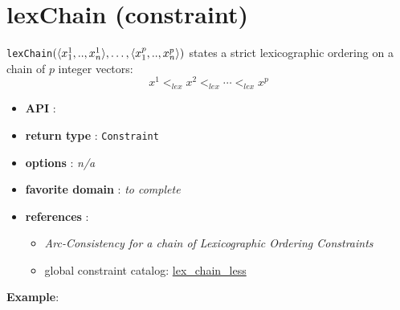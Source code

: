 \label{lexchain}
\hypertarget{lexchain}{}

\section{lexChain (constraint)}\label{lexchain:lexchainconstraint}\hypertarget{lexchain:lexchainconstraint}{}
\begin{notedef}
  \texttt{lexChain}$(\langle x^1_1,..,x^1_n\rangle,\ldots,\langle x^p_1,..,x^p_n\rangle)$ states a strict lexicographic ordering on a chain of $p$ integer vectors:
$$x^1 <_{lex} x^2 <_{lex}\cdots <_{lex} x^p$$
\end{notedef}

\begin{itemize}
	\item \textbf{API} : 
	\item \textbf{return type} : \texttt{Constraint}
	\item \textbf{options} : \emph{n/a}
	\item \textbf{favorite domain} : \emph{to complete}
	\item \textbf{references} :
      \begin{itemize}
      \item \cite{BeldiceanuSICS02} \emph{Arc-Consistency for a chain of Lexicographic Ordering Constraints} 
      \item global constraint catalog: \href{http://www.emn.fr/x-info/sdemasse/gccat/Clex_chain_less.html}{lex\_chain\_less}
      \end{itemize}
\end{itemize}

\textbf{Example}:

